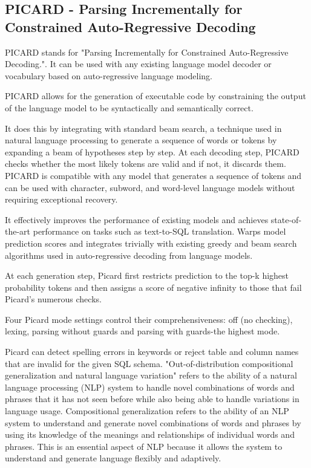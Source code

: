 \subsection{PICARD - Parsing Incrementally for Constrained Auto-Regressive Decoding}
\label{picard}

PICARD\cite{Scholak2021:PICARD} stands for "Parsing Incrementally for Constrained Auto-Regressive Decoding.". It can be used with any existing language model decoder or vocabulary based on auto-regressive language modeling.

PICARD allows for the generation of executable code by constraining the output of the language model to be syntactically and semantically correct.

It does this by integrating with standard beam search, a technique used in natural language processing to generate a sequence of words or tokens by expanding a beam of hypotheses step by step. At each decoding step, PICARD checks whether the most likely tokens are valid and if not, it discards them. PICARD is compatible with any model that generates a sequence of tokens and can be used with character, subword, and word-level language models without requiring exceptional recovery.

It effectively improves the performance of existing models and achieves state-of-the-art performance on tasks such as text-to-SQL translation.
Warps model prediction scores and integrates trivially with existing greedy and beam search algorithms used in auto-regressive decoding from language models.

At each generation step, Picard first restricts prediction to the top-k highest probability tokens and then assigns a score of negative infinity to those that fail Picard's numerous checks.

Four Picard mode settings control their comprehensiveness: off (no checking), lexing, parsing without guards and parsing with guards-the highest mode.

Picard can detect spelling errors in keywords or reject table and column names that are invalid for the given SQL schema.
"Out-of-distribution compositional generalization and natural language variation" refers to the ability of a natural language processing (NLP) system to handle novel combinations of words and phrases that it has not seen before while also being able to handle variations in language usage.
Compositional generalization refers to the ability of an NLP system to understand and generate novel combinations of words and phrases by using its knowledge of the meanings and relationships of individual words and phrases. This is an essential aspect of NLP because it allows the system to understand and generate language flexibly and adaptively.

